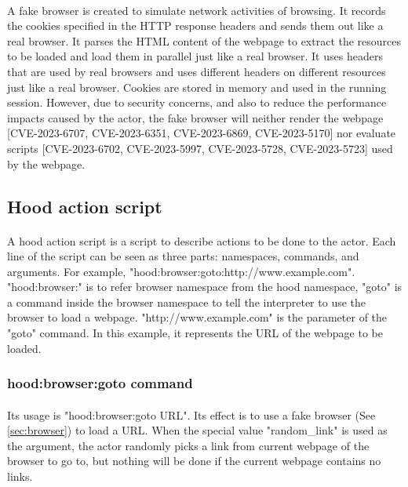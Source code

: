 \documentclass[mscthesis]{usiinfthesis}
\begin{document}
\paragraph{}
A fake browser is created to simulate network activities of browsing. It records the cookies specified in the HTTP response headers and sends them out like a real browser. It parses the HTML content of the webpage to extract the resources to be loaded and load them in parallel just like a real browser. It uses headers that are used by real browsers and uses different headers on different resources just like a real browser. Cookies are stored in memory and used in the running session. However, due to security concerns, and also to reduce the performance impacts caused by the actor, the fake browser will neither render the webpage [CVE-2023-6707, CVE-2023-6351, CVE-2023-6869, CVE-2023-5170] nor evaluate scripts [CVE-2023-6702, CVE-2023-5997, CVE-2023-5728, CVE-2023-5723] used by the webpage.

\subsection{Hood action script}
\paragraph{}
A hood action script is a script to describe actions to be done to the actor. Each line of the script can be seen as three parts: namespaces, commands, and arguments. For example, \newline "hood:browser:goto:http://www.example.com". "hood:browser:" is to refer browser namespace from the hood namespace, "goto" is a command inside the browser namespace to tell the interpreter to use the browser to load a webpage. "http://www.example.com" is the parameter of the "goto" command. In this example, it represents the URL of the webpage to be loaded.
\subsubsection{hood:browser:goto command}
\paragraph{}
Its usage is "hood:browser:goto URL". Its effect is to use a fake browser (See \cref{sec:browser}) to load a URL. When the special value "random\_link" is used as the argument, the actor randomly picks a link from current webpage of the browser to go to, but nothing will be done if the current webpage contains no links.
\end{document}
